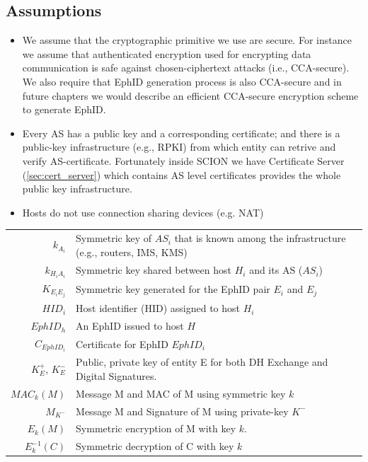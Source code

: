 \subsection{Assumptions}

\begin{itemize}
    \item We assume that the cryptographic primitive we use are secure. For instance we assume that authenticated encryption used for encrypting data communication is safe against chosen-ciphertext attacks (i.e., CCA-secure). We also require that EphID generation process is also CCA-secure and in future chapters we would describe an efficient CCA-secure encryption scheme to generate EphID.
    \item Every AS has a public key and a corresponding certificate; and there is a public-key infrastructure (e.g., RPKI) from which entity can retrive and verify AS-certificate. Fortunately inside SCION we have Certificate Server (\ref{sec:cert_server}) which contains AS level certificates provides the whole public key infrastructure.
    \item Hosts do not use connection sharing devices (e.g. NAT)
\end{itemize}
\newpage
\bgroup
\def\arraystretch{1.5}%
\begin{center}
 \label{tab:notation} 
\begin{tabular}{r  l}
  \hline			
  $k_{A_{i}}$ & Symmetric key of $AS_i$ that is known among the infrastructure (e.g., routers, IMS, KMS)\\
  $k_{H_{i}A_{i}}$ & Symmetric key shared between host $H_i$ and its AS ($AS_i$) \\
  $K_{E_{i}E_{j}}$ & Symmetric key generated for the EphID pair $E_i$ and $E_j$ \\ 
  $HID_i$ & Host identifier (HID) assigned to host $H_i$ \\
  $EphID_h$ & An EphID issued to host $H$ \\
  $C_{EphID_{i}}$ & Certificate for EphID $EphID_i$ \\
  $K^{+}_{E}$, $K^{-}_{E}$ & Public, private key of entity E for both DH Exchange and Digital Signatures.\\
  $MAC_k(M)$ & Message M and MAC of M using symmetric key $k$ \\
  ${M}_{K^{-}}$ & Message M and Signature of M using private-key $K^{-}$ \\
  $E_{k}(M)$ & Symmetric encryption of M with key $k$. \\
  $E^{-1}_{k}(C)$ & Symmetric decryption of C with key $k$ \\
  \hline  
\end{tabular}
\end{center}
\egroup

